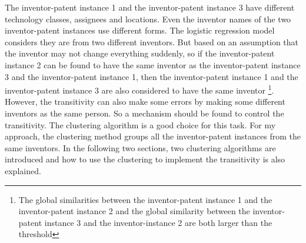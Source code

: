The inventor-patent instance 1 and the inventor-patent instance 3 have different technology classes, assignees and locations. Even the inventor names of the two inventor-patent instances use different forms. The logistic regression model considers they are from two different inventors. But based on an assumption that the inventor may not change everything suddenly, so if the inventor-patent instance 2 can be found to have the same inventor as the inventor-patent instance 3 and the inventor-patent instance 1, then the inventor-patent instance 1 and the inventor-patent instance 3 are also considered to have the same inventor \footnote{The global similarities between the inventor-patent instance 1 and the inventor-patent instance 2 and the global similarity between the inventor-patent instance 3 and the inventor-instance 2 are both larger than the threshold}. However, the transitivity can also make some errors by making some different inventors as the same person. So a mechanism should be found to control the transitivity. The clustering algorithm is a good choice for this task. For my approach, the clustering method groups all the inventor-patent instances from the same inventors. In the following two sections, two clustering algorithms are introduced and how to use the clustering to implement the transitivity is also explained.


